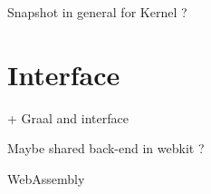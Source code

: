 \documentclass[a4paper,12pt,twoside]{../includes/ThesisStyle}
\begin{document}
Snapshot in general for Kernel ?


\section{Interface}

+ Graal and interface

Maybe shared back-end in webkit ?

WebAssembly







\end{document}
